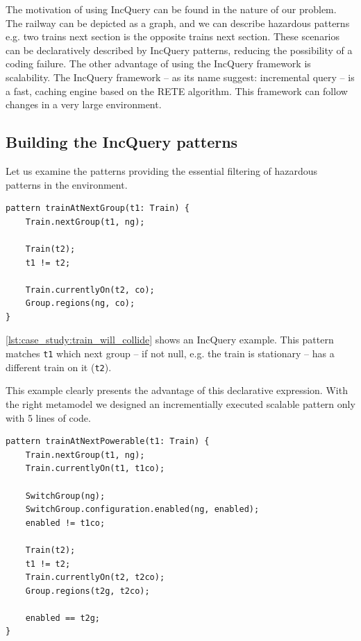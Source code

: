 The motivation of using IncQuery can be found in the nature of our problem. The railway can be depicted as a graph, and we can describe hazardous patterns e.g. two trains next section is the opposite trains next section. These scenarios can be declaratively described by IncQuery patterns, reducing the possibility of a coding failure. The other advantage of using the IncQuery framework is scalability. The IncQuery framework -- as its name suggest: incremental query -- is a fast, caching engine based on the RETE algorithm. This framework can follow changes in a very large environment. 

\subsection{Building the IncQuery patterns}
\label{sec:case_study:pattern_building}

Let us examine the patterns providing the essential filtering of hazardous patterns in the environment.
\\[1ex]

\begin{lstlisting}[caption={Collision detection},label=lst:case_study:train_will_collide]
pattern trainAtNextGroup(t1: Train) {
	Train.nextGroup(t1, ng);
	
	Train(t2);
	t1 != t2;
	
	Train.currentlyOn(t2, co);
	Group.regions(ng, co);
}
\end{lstlisting}

\cref{lst:case_study:train_will_collide} shows an IncQuery example. This pattern matches \verb+t1+ which next group -- if not null, e.g. the train is stationary -- has a different train on it (\verb+t2+).

This example clearly presents the advantage of this declarative expression. With the right metamodel we designed an incrementially executed scalable pattern only with 5 lines of code.
\\[1ex]

\begin{lstlisting}[caption={Collision detection},label=lst:case_study:train_at_next_powerable]
pattern trainAtNextPowerable(t1: Train) {
	Train.nextGroup(t1, ng);
	Train.currentlyOn(t1, t1co);
	
	SwitchGroup(ng);
	SwitchGroup.configuration.enabled(ng, enabled);
	enabled != t1co;
	
	Train(t2);
	t1 != t2;
	Train.currentlyOn(t2, t2co);
	Group.regions(t2g, t2co);
	
	enabled == t2g;
}
\end{lstlisting}

